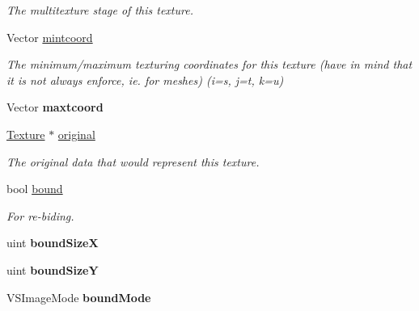 \begin{DoxyCompactItemize}
\begin{DoxyCompactList}\small\item\em The multitexture stage of this texture. \end{DoxyCompactList}\item 
Vector \hyperlink{classTexture_a4dc650c6fc7b876b6231f6f0b0696c03}{mintcoord}\hypertarget{classTexture_a4dc650c6fc7b876b6231f6f0b0696c03}{}\label{classTexture_a4dc650c6fc7b876b6231f6f0b0696c03}

\begin{DoxyCompactList}\small\item\em The minimum/maximum texturing coordinates for this texture (have in mind that it is not always enforce, ie. for meshes) (i=s, j=t, k=u) \end{DoxyCompactList}\item 
Vector {\bfseries maxtcoord}\hypertarget{classTexture_a996cdd4622e301d17c36033e5b3ac59d}{}\label{classTexture_a996cdd4622e301d17c36033e5b3ac59d}

\item 
\hyperlink{classTexture}{Texture} $\ast$ \hyperlink{classTexture_a46f17f1846a20ed29ac78431d9f1c73b}{original}\hypertarget{classTexture_a46f17f1846a20ed29ac78431d9f1c73b}{}\label{classTexture_a46f17f1846a20ed29ac78431d9f1c73b}

\begin{DoxyCompactList}\small\item\em The original data that would represent this texture. \end{DoxyCompactList}\item 
bool \hyperlink{classTexture_aa6c1c659fed7f20e7c01c7299f55efc1}{bound}\hypertarget{classTexture_aa6c1c659fed7f20e7c01c7299f55efc1}{}\label{classTexture_aa6c1c659fed7f20e7c01c7299f55efc1}

\begin{DoxyCompactList}\small\item\em For re-\/biding. \end{DoxyCompactList}\item 
uint {\bfseries bound\+SizeX}\hypertarget{classTexture_acdcfd172fd8f9311c2199f8ba002b3fe}{}\label{classTexture_acdcfd172fd8f9311c2199f8ba002b3fe}

\item 
uint {\bfseries bound\+SizeY}\hypertarget{classTexture_ac02a8de3287fb6310b774ad1cd1adf38}{}\label{classTexture_ac02a8de3287fb6310b774ad1cd1adf38}

\item 
V\+S\+Image\+Mode {\bfseries bound\+Mode}\hypertarget{classTexture_a718baa12e337a272acf252ff3c0d4c32}{}\label{classTexture_a718baa12e337a272acf252ff3c0d4c32}


\end{DoxyCompactItemize}
